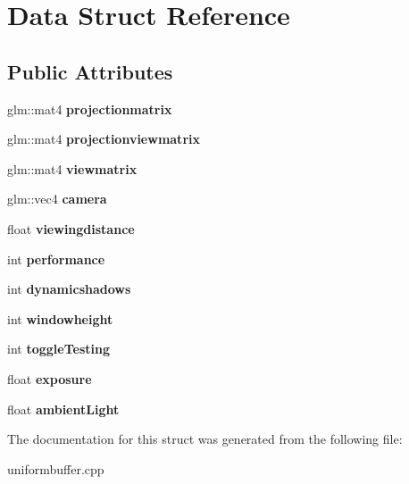\hypertarget{structData}{\section{\-Data \-Struct \-Reference}
\label{structData}
}
\subsection*{\-Public \-Attributes}
\begin{DoxyCompactItemize}
\item 
\hypertarget{structData_abeda0dab8e22c6b41b9e3e19f0665524}{glm\-::mat4 {\bfseries projectionmatrix}}\label{structData_abeda0dab8e22c6b41b9e3e19f0665524}

\item 
\hypertarget{structData_a1db0d7b30c27fc1ada74baf396f621ad}{glm\-::mat4 {\bfseries projectionviewmatrix}}\label{structData_a1db0d7b30c27fc1ada74baf396f621ad}

\item 
\hypertarget{structData_a8769f1fa97b23d614092404fc92c768e}{glm\-::mat4 {\bfseries viewmatrix}}\label{structData_a8769f1fa97b23d614092404fc92c768e}

\item 
\hypertarget{structData_aac1243b77cd89649a159926c76e41e21}{glm\-::vec4 {\bfseries camera}}\label{structData_aac1243b77cd89649a159926c76e41e21}

\item 
\hypertarget{structData_a64bcfa2de4f541f2e78e07783ff54493}{float {\bfseries viewingdistance}}\label{structData_a64bcfa2de4f541f2e78e07783ff54493}

\item 
\hypertarget{structData_af6a336d6a6c82227053ff5540aa94526}{int {\bfseries performance}}\label{structData_af6a336d6a6c82227053ff5540aa94526}

\item 
\hypertarget{structData_a8fef884a97064a497f1f61e92a496d86}{int {\bfseries dynamicshadows}}\label{structData_a8fef884a97064a497f1f61e92a496d86}

\item 
\hypertarget{structData_a8e994d240a8122b9aa9e90bf6cb20912}{int {\bfseries windowheight}}\label{structData_a8e994d240a8122b9aa9e90bf6cb20912}

\item 
\hypertarget{structData_ad6771abcfa9848313a4da92d2de6a0ca}{int {\bfseries toggle\-Testing}}\label{structData_ad6771abcfa9848313a4da92d2de6a0ca}

\item 
\hypertarget{structData_a9ab88fa045dc69ac62a085ae8e506997}{float {\bfseries exposure}}\label{structData_a9ab88fa045dc69ac62a085ae8e506997}

\item 
\hypertarget{structData_ab4ebab84b52d9b6a9f7010d3cbee39f2}{float {\bfseries ambient\-Light}}\label{structData_ab4ebab84b52d9b6a9f7010d3cbee39f2}

\end{DoxyCompactItemize}


\-The documentation for this struct was generated from the following file\-:\begin{DoxyCompactItemize}
\item 
uniformbuffer.\-cpp\end{DoxyCompactItemize}
